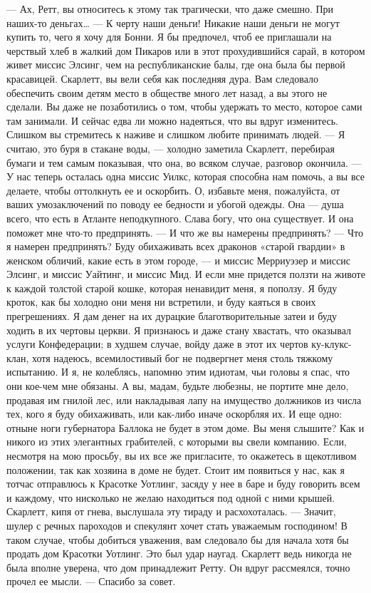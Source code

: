 — Ах, Ретт, вы относитесь к этому так трагически, что даже смешно. При наших-то деньгах…
— К черту наши деньги! Никакие наши деньги не могут купить то, чего я хочу для Бонни. Я бы предпочел, чтоб ее приглашали на черствый хлеб в жалкий дом Пикаров или в этот прохудившийся сарай, в котором живет миссис Элсинг, чем на республиканские балы, где она была бы первой красавицей. Скарлетт, вы вели себя как последняя дура. Вам следовало обеспечить своим детям место в обществе много лет назад, а вы этого не сделали. Вы даже не позаботились о том, чтобы удержать то место, которое сами там занимали. И сейчас едва ли можно надеяться, что вы вдруг изменитесь. Слишком вы стремитесь к наживе и слишком любите принимать людей.
— Я считаю, это буря в стакане воды, — холодно заметила Скарлетт, перебирая бумаги и тем самым показывая, что она, во всяком случае, разговор окончила.
— У нас теперь осталась одна миссис Уилкс, которая способна нам помочь, а вы все делаете, чтобы оттолкнуть ее и оскорбить. О, избавьте меня, пожалуйста, от ваших умозаключений по поводу ее бедности и убогой одежды. Она — душа всего, что есть в Атланте неподкупного. Слава богу, что она существует. И она поможет мне что-то предпринять.
— И что же вы намерены предпринять?
— Что я намерен предпринять? Буду обихаживать всех драконов «старой гвардии» в женском обличий, какие есть в этом городе, — и миссис Мерриуэзер и миссис Элсинг, и миссис Уайтинг, и миссис Мид. И если мне придется ползти на животе к каждой толстой старой кошке, которая ненавидит меня, я поползу. Я буду кроток, как бы холодно они меня ни встретили, и буду каяться в своих прегрешениях. Я дам денег на их дурацкие благотворительные затеи и буду ходить в их чертовы церкви. Я признаюсь и даже стану хвастать, что оказывал услуги Конфедерации; в худшем случае, войду даже в этот их чертов ку-клукс-клан, хотя надеюсь, всемилостивый бог не подвергнет меня столь тяжкому испытанию. И я, не колеблясь, напомню этим идиотам, чьи головы я спас, что они кое-чем мне обязаны. А вы, мадам, будьте любезны, не портите мне дело, продавая им гнилой лес, или накладывая лапу на имущество должников из числа тех, кого я буду обихаживать, или как-либо иначе оскорбляя их. И еще одно: отныне ноги губернатора Баллока не будет в этом доме. Вы меня слышите? Как и никого из этих элегантных грабителей, с которыми вы свели компанию. Если, несмотря на мою просьбу, вы их все же пригласите, то окажетесь в щекотливом положении, так как хозяина в доме не будет. Стоит им появиться у нас, как я тотчас отправлюсь к Красотке Уотлинг, засяду у нее в баре и буду говорить всем и каждому, что нисколько не желаю находиться под одной с ними крышей.
Скарлетт, кипя от гнева, выслушала эту тираду и расхохоталась.
— Значит, шулер с речных пароходов и спекулянт хочет стать уважаемым господином! В таком случае, чтобы добиться уважения, вам следовало бы для начала хотя бы продать дом Красотки Уотлинг. Это был удар наугад. Скарлетт ведь никогда не была вполне уверена, что дом принадлежит Ретту. Он вдруг рассмеялся, точно прочел ее мысли.
— Спасибо за совет.




